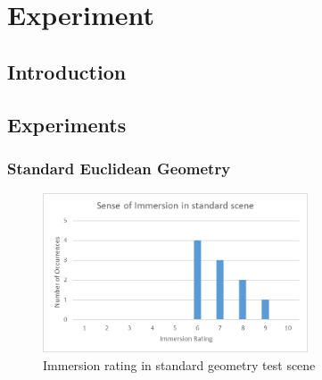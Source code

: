 \chapter{Experiment}
\label{exp}

	\section{Introduction}
	\label{exp:intro}


	\section{Experiments}
	\label{exp:exp}

		\subsection{Standard Euclidean Geometry}
		\label{exp:exp:standard}


			\begin{figure}
				\label{exp:fig:standard_immersion}
				\includegraphics[width=0.7\textwidth]{Images/Standard_Immersion}
				\centering
				\caption{Immersion rating in standard geometry test scene}
			\end{figure}


